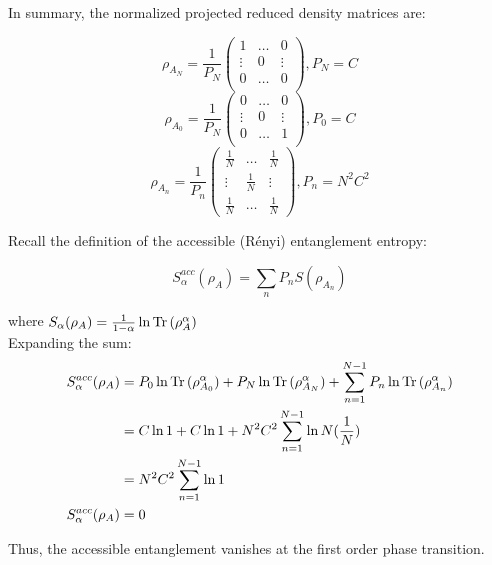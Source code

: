 In summary, the normalized projected reduced density matrices are:

\begin{equation}
\rho_{A_N} = \frac{1}{P_{N}} \begin{pmatrix}
1 & \dots & 0 \\ 
\vdots & 0 & \vdots \\
0 & \dots & 0 \\
\end{pmatrix}, P_{N}=C 
\end{equation}
\begin{equation}
 \rho_{A_0} = \frac{1}{P_{N}} \begin{pmatrix}
0 & \dots & 0 \\ 
\vdots & 0 & \vdots \\
0 & \dots & 1 \\
\end{pmatrix}, P_{0}=C 
\end{equation}
\begin{equation}
\rho_{A_n} = \frac{1}{P_{n}} \begin{pmatrix}
\frac{1}{N} & \dots & \frac{1}{N} \\ 
\vdots & \frac{1}{N} & \vdots \\
\frac{1}{N} & \dots & \frac{1}{N}
\end{pmatrix}, P_{n}=N^2C^2 
\end{equation}

Recall the definition of the accessible (R\'enyi) entanglement entropy:

\[S_{\alpha}^{acc}(\rho_{A}) = \sum_{n} P_{n}S(\rho_{A_n})\]

where $S_{\alpha}(\rho_A) = \frac{1}{1-\alpha} \ln{\operatorname{Tr}{(\rho_A^{\alpha})}}$
\\

Expanding the sum:
\begin{align}
S_{\alpha}^{acc}(\rho_{A}) &= P_{0} \ln{\operatorname{Tr}{(\rho_{A_0}^{\alpha})}} + P_{N} \ln{\operatorname{Tr}{(\rho_{A_N}^{\alpha})}} + \sum_{n=1}^{N-1} P_{n} \ln{\operatorname{Tr}{(\rho_{A_n}^{\alpha})}} \nonumber \\
&= C \ln{1} + C \ln{1} + N^2C^2 \sum_{n=1}^{N-1} \ln{N(\frac{1}{N})}  \nonumber \\
&= N^2C^2 \sum_{n=1}^{N-1} \ln{1} \nonumber \\
S_{\alpha}^{acc}(\rho_{A}) &= 0 
\end{align}

Thus, the accessible entanglement vanishes at the first order phase transition. \\

